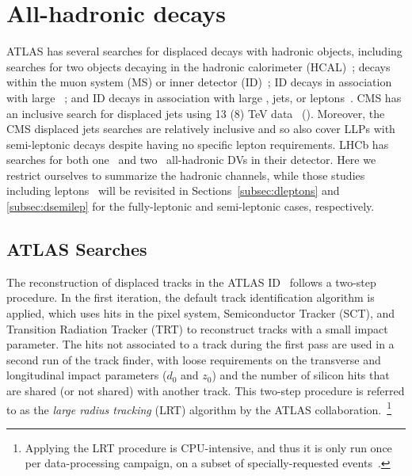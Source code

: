 \section{All-hadronic decays}
\label{subsec:djets}

ATLAS has several searches for displaced decays with hadronic objects, including searches for two objects decaying in the hadronic calorimeter (HCAL)~\cite{ATLAS-CONF-2016-103,CalRatio8TeV}; decays within the muon system (MS) or inner detector (ID)~\cite{Aad:2015uaa}; ID decays in association with large \met~\cite{Aaboud:2017iio}; and ID decays in association with large \met, jets, or leptons~\cite{Aad:2015rba}.  CMS has an inclusive search for displaced jets using 13 (8) TeV data~\cite{CMS:2017oor} (\cite{CMS:2014wda}). Moreover, the CMS displaced jets searches are relatively inclusive and so also cover LLPs with semi-leptonic decays despite having no specific lepton requirements. LHCb has searches for both one~\cite{Aaij:2017mic} and two~\cite{Aaij:2016isa} all-hadronic DVs in their detector. Here we restrict ourselves to summarize the hadronic channels, while those studies including leptons~\cite{Aad:2015rba,CMS:2017oor} will be revisited in Sections~\ref{subsec:dleptons} and \ref{subsec:dsemilep} for the fully-leptonic and semi-leptonic cases, respectively.

\subsection{ATLAS Searches}

The reconstruction of displaced tracks in the ATLAS ID~\cite{ATL-PHYS-PUB-2017-014} follows a two-step procedure. In the first iteration, the default track identification algorithm is applied, which uses hits in the pixel system, Semiconductor Tracker (SCT), and Transition Radiation Tracker (TRT) to reconstruct tracks with a small impact parameter.  The hits not associated to a track during the first pass are used in a second run of the track finder, with loose requirements on the transverse and longitudinal impact parameters ($d_{0}$ and $z_{0}$) and the number of silicon hits that are shared (or not shared) with another track. This two-step procedure is referred to as the \emph{large radius tracking} (LRT) algorithm by the ATLAS collaboration.~\footnote{Applying the LRT procedure is CPU-intensive, and thus it is only run once per data-processing campaign, on a subset of specially-requested events~\cite{ATL-PHYS-PUB-2017-014}.}

